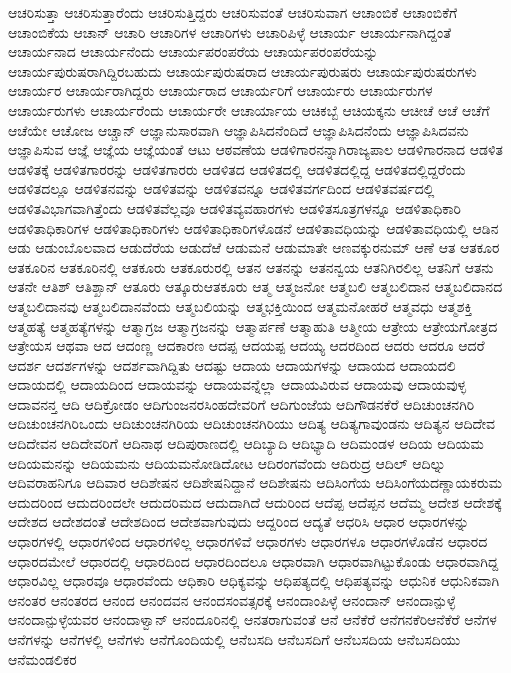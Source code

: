 {ಆಚರಿಸುತ್ತಾ
ಆಚರಿಸುತ್ತಾರೆಂದು
ಆಚರಿಸುತ್ತಿದ್ದರು
ಆಚರಿಸುವಂತೆ
ಆಚರಿಸುವಾಗ
ಆಚಾಂಬಿಕೆ
ಆಚಾಂಬಿಕೆಗೆ
ಆಚಾಂಬಿಕೆಯ
ಆಚಾನ್
ಆಚಾರಿ
ಆಚಾರಿಗಳ
ಆಚಾರಿಗಳು
ಆಚಾರಿಪಿಳ್ಳೆ
ಆಚಾರ್ಯ
ಆಚಾರ್ಯನಾಗಿದ್ದಂತೆ
ಆಚಾರ್ಯನಾದ
ಆಚಾರ್ಯನೆಂದು
ಆಚಾರ್ಯಪರಂಪರೆಯ
ಆಚಾರ್ಯಪರಂಪರೆಯನ್ನು
ಆಚಾರ್ಯಪುರುಷರಾಗಿದ್ದಿರಬಹುದು
ಆಚಾರ್ಯಪುರುಷರಾದ
ಆಚಾರ್ಯಪುರುಷರು
ಆಚಾರ್ಯಪುರುಷರುಗಳು
ಆಚಾರ್ಯರ
ಆಚಾರ್ಯರಾಗಿದ್ದರು
ಆಚಾರ್ಯರಾದ
ಆಚಾರ್ಯರಿಗೆ
ಆಚಾರ್ಯರು
ಆಚಾರ್ಯರುಗಳ
ಆಚಾರ್ಯರುಗಳು
ಆಚಾರ್ಯರೆಂದು
ಆಚಾರ್ಯರೇ
ಆಚಾರ್ಯಾಯ
ಆಚಿಕಬ್ಬೆ
ಆಚಿಯಕ್ಕನು
ಆಚೀಚೆ
ಆಚೆ
ಆಚೆಗೆ
ಆಚೆಯೇ
ಆಚೋಜ
ಆಚ್ಚಾನ್
ಆಜ್ಞಾನುಸಾರವಾಗಿ
ಆಜ್ಞಾಪಿಸಿದನೆಂದಿದೆ
ಆಜ್ಞಾಪಿಸಿದನೆಂದು
ಆಜ್ಞಾಪಿಸಿದವನು
ಆಜ್ಞಾಪಿಸುವ
ಆಜ್ಞೆ
ಆಜ್ಞೆಯ
ಆಜ್ಞೆಯಂತೆ
ಆಟು
ಆಠವಣೆಯ
ಆಡಳಿಗಾರನನ್ನಾಗಿರಾಜ್ಯಪಾಲ
ಆಡಳಿಗಾರನಾದ
ಆಡಳಿತ
ಆಡಳಿತಕ್ಕೆ
ಆಡಳಿತಗಾರರನ್ನು
ಆಡಳಿತಗಾರರು
ಆಡಳಿತದ
ಆಡಳಿತದಲ್ಲಿ
ಆಡಳಿತದಲ್ಲಿದ್ದ
ಆಡಳಿತದಲ್ಲಿದ್ದರೆಂದು
ಆಡಳಿತದಲ್ಲೂ
ಆಡಳಿತನವನ್ನು
ಆಡಳಿತವನ್ನು
ಆಡಳಿತವನ್ನೂ
ಆಡಳಿತವರ್ಗದಿಂದ
ಆಡಳಿತವರ್ಷದಲ್ಲಿ
ಆಡಳಿತವಿಭಾಗವಾಗಿತ್ತೆಂದು
ಆಡಳಿತವೆಲ್ಲವೂ
ಆಡಳಿತವ್ಯವಹಾರಗಳು
ಆಡಳಿತಸೂತ್ರಗಳನ್ನೂ
ಆಡಳಿತಾಧಿಕಾರಿ
ಆಡಳಿತಾಧಿಕಾರಿಗಳ
ಆಡಳಿತಾಧಿಕಾರಿಗಳು
ಆಡಳಿತಾಧಿಕಾರಿಗಳೊಡನೆ
ಆಡಳಿತಾವಧಿಯನ್ನು
ಆಡಳಿತಾವಧಿಯಲ್ಲಿ
ಆಡಿನ
ಆಡು
ಆಡುಂಬೊಲವಾದ
ಆಡುದೆರೆಯ
ಆಡುದೆಱೆ
ಆಡುಮನೆ
ಆಡುಮಾತೇ
ಆಣವಕ್ಕುರನುಮ್
ಆಣೆ
ಆತ
ಆತಕೂರ
ಆತಕೂರಿನ
ಆತಕೂರಿನಲ್ಲಿ
ಆತಕೂರು
ಆತಕೂರುರಲ್ಲಿ
ಆತನ
ಆತನನ್ನು
ಆತನನ್ವಯ
ಆತನಿಗಿರಲಿಲ್ಲ
ಆತನಿಗೆ
ಆತನು
ಆತನೇ
ಆತಿಶ್
ಆತಿಶ್ಖಾನ್
ಆತೂರು
ಆತ್ಕೂರುಆತಕೂರು
ಆತ್ಮ
ಆತ್ಮಜನೋ
ಆತ್ಮಬಲಿ
ಆತ್ಮಬಲಿದಾನ
ಆತ್ಮಬಲಿದಾನದ
ಆತ್ಮಬಲಿದಾನವು
ಆತ್ಮಬಲಿದಾನವೆಂದು
ಆತ್ಮಬಲಿಯನ್ನು
ಆತ್ಮಭಕ್ತಿಯಿಂದ
ಆತ್ಮಮನೋಹರೆ
ಆತ್ಮವಧು
ಆತ್ಮಶಕ್ತಿ
ಆತ್ಮಹತ್ಯೆ
ಆತ್ಮಹತ್ಯೆಗಳನ್ನು
ಆತ್ಮಾಗ್ರಜ
ಆತ್ಮಾಗ್ರಜನನ್ನು
ಆತ್ಮಾರ್ಪಣೆ
ಆತ್ಮಾಹುತಿ
ಆತ್ಮೀಯ
ಆತ್ರೇಯ
ಆತ್ರೇಯಗೋತ್ರದ
ಆತ್ರೇಯಸ
ಆಥವಾ
ಆದ
ಆದಂಣ್ಣ
ಆದಕಾರಣ
ಆದಪ್ಪ
ಆದಯಪ್ಪ
ಆದಯ್ಯ
ಆದರದಿಂದ
ಆದರು
ಆದರೂ
ಆದರೆ
ಆದರ್ಶ
ಆದರ್ಶಗಳನ್ನು
ಆದರ್ಶವಾಗಿದ್ದಿತು
ಆದಷ್ಟು
ಆದಾಯ
ಆದಾಯಗಳನ್ನು
ಆದಾಯದ
ಆದಾಯದಲಿ
ಆದಾಯದಲ್ಲಿ
ಆದಾಯದಿಂದ
ಆದಾಯವನ್ನು
ಆದಾಯವನ್ನೆಲ್ಲಾ
ಆದಾಯವಿರುವ
ಆದಾಯವು
ಆದಾಯವುಳ್ಳ
ಆದಾವನನ್ತ
ಆದಿ
ಆದಿಕ್ರೋಡಂ
ಆದಿಗುಂಜನರಸಿಂಹದೇವರಿಗೆ
ಆದಿಗುಂಜೆಯ
ಆದಿಗೌಡನಕೆರೆ
ಆದಿಚುಂಚನಗಿರಿ
ಆದಿಚುಂಚನಗಿರಿಒಂದು
ಆದಿಚುಂಚನಗಿರಿಯ
ಆದಿಚುಂಚನಗಿರಿಯು
ಆದಿತ್ಯ
ಆದಿತ್ಯಗಾವುಂಡನು
ಆದಿತ್ಯನ
ಆದಿದೇವ
ಆದಿದೇವನ
ಆದಿದೇವರಿಗೆ
ಆದಿನಾಥ
ಆದಿಪುರಾಣದಲ್ಲಿ
ಆದಿಬ್ಯಾದಿ
ಆದಿಭ್ಯಾದಿ
ಆದಿಮಂಡಳ
ಆದಿಯ
ಆದಿಯಮ
ಆದಿಯಮನನ್ನು
ಆದಿಯಮನು
ಆದಿಯಮನೋಡಿದೋಟ
ಆದಿರಂಗವೆಂದು
ಆದಿರುದ್ರ
ಆದಿಲ್
ಆದಿಲ್ನು
ಆದಿವರಾಹನಿಗೂ
ಆದಿವಾರ
ಆದಿಶೇಷನ
ಆದಿಶೇಷನಿದ್ದಾನೆ
ಆದಿಶೇಷನು
ಆದಿಸಿಂಗೆಯ
ಆದಿಸಿಂಗೆಯದಣ್ಣಾಯಕರುಮ
ಆದುದರಿಂದ
ಆದುದರಿಂದಲೇ
ಆದುದರಿಮದ
ಆದುದಾಗಿದೆ
ಆದುರಿಂದ
ಆದೆಪ್ಪ
ಆದೆಪ್ಪನ
ಆದೆಮ್ಮ
ಆದೇಶ
ಆದೇಶಕ್ಕೆ
ಆದೇಶದ
ಆದೇಶದಂತೆ
ಆದೇಶದಿಂದ
ಆದೇಶವಾಗುವುದು
ಆದ್ದರಿಂದ
ಆದ್ಯತೆ
ಆಧರಿಸಿ
ಆಧಾರ
ಆಧಾರಗಳನ್ನು
ಆಧಾರಗಳಲ್ಲಿ
ಆಧಾರಗಳಿಂದ
ಆಧಾರಗಳಿಲ್ಲ
ಆಧಾರಗಳಿವೆ
ಆಧಾರಗಳು
ಆಧಾರಗಳೂ
ಆಧಾರಗಳೊಡೆನ
ಆಧಾರದ
ಆಧಾರದಮೇಲೆ
ಆಧಾರದಲ್ಲಿ
ಆಧಾರದಿಂದ
ಆಧಾರದಿಂದಲೂ
ಆಧಾರವಾಗಿ
ಆಧಾರವಾಗಿಟ್ಟುಕೊಂಡು
ಆಧಾರವಾಗಿದ್ದ
ಆಧಾರವಿಲ್ಲ
ಆಧಾರವೂ
ಆಧಾರವೆಂದು
ಆಧಿಕಾರಿ
ಆಧಿಕ್ಯವನ್ನು
ಆಧಿಪತ್ಯದಲ್ಲಿ
ಆಧಿಪತ್ಯವನ್ನು
ಆಧುನಿಕ
ಆಧುನಿಕವಾಗಿ
ಆನಂತರ
ಆನಂತರದ
ಆನಂದ
ಆನಂದವನ
ಆನಂದಸಂವತ್ಸರಕ್ಕೆ
ಆನಂದಾಂಪಿಳ್ಳೆ
ಆನಂದಾನ್
ಆನಂದಾನ್ಪುಳ್ಳೆ
ಆನಂದಾನ್ಪುಳ್ಳೆಯವರ
ಆನಂದಾಳ್ವಾನ್
ಆನಂದೂರಿನಲ್ಲಿ
ಆನತರಾಗುವಂತೆ
ಆನೆ
ಆನೆಕೆರೆ
ಆನೆಗನಕೆರಿಆನೆಕೆರೆ
ಆನೆಗಳ
ಆನೆಗಳನ್ನು
ಆನೆಗಳಲ್ಲಿ
ಆನೆಗಳು
ಆನೆಗೊಂದಿಯಲ್ಲಿ
ಆನೆಬಸದಿ
ಆನೆಬಸದಿಗೆ
ಆನೆಬಸದಿಯ
ಆನೆಬಸದಿಯು
ಆನೆಮಂಡಲಿಕರ
}
